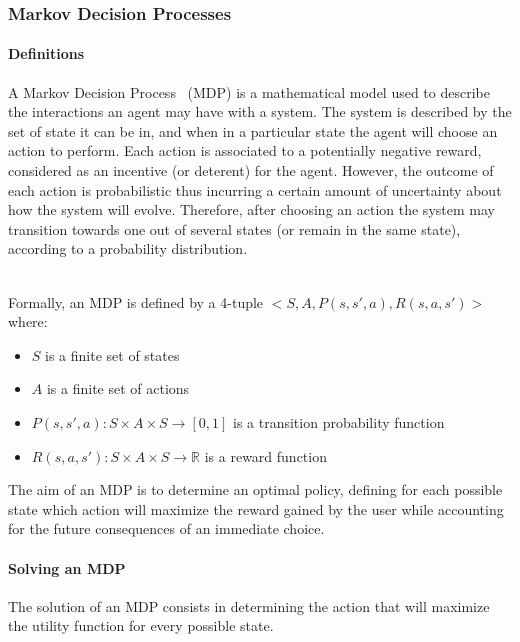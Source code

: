 \newpage
\subsubsection{Markov Decision Processes}

\paragraph{Definitions}
A Markov Decision Process~\cite{bellman1957} (MDP) is a mathematical model used to describe the interactions  an agent may have with a system.
The system is described by the set of state it can be in, and when in a particular state the agent will choose an action to perform.
Each action is associated to a potentially negative reward, considered as an incentive (or deterent) for the agent.
However, the outcome of each action is probabilistic thus incurring a certain amount of uncertainty about how the system will evolve.
Therefore, after choosing an action the system may transition towards one out of several states (or remain in the same state), according to a probability distribution.



\textbf{\\}
Formally, an MDP is defined by a 4-tuple $<S,A,P(s,s',a),R(s,a,s')>$ where:
\begin{itemize}
    \item $S$ is a finite set of states
    \item $A$ is a finite set of actions
    \item $P(s,s',a) : S \times A \times S \longrightarrow [0,1]$ is a transition probability function
    \item $R(s,a,s') : S \times A \times S \longrightarrow \mathbb{R}$ is a reward function
\end{itemize}

The aim of an MDP is to determine an optimal policy, defining for each possible state which action will maximize the reward gained by the user while accounting for the future consequences of an immediate choice.

\paragraph{Solving an MDP}
The solution of an MDP consists in determining the action that will maximize the utility function for every possible state.

